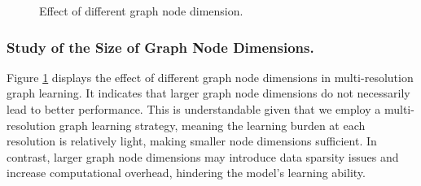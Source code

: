 \begin{figure}[!t]
    \vspace{-4mm}
    \centering
    \vspace{-4.5mm}
    \caption{Effect of different graph node dimension.}
    \label{fig:parameter_node_dim}
    \vspace{-5.5mm}
\end{figure}


\subsubsection{Study of the Size of Graph Node Dimensions.} Figure \ref{fig:parameter_node_dim} displays the effect of different graph node dimensions in multi-resolution graph learning. It indicates that larger graph node dimensions do not necessarily lead to better performance. This is understandable given that we employ a multi-resolution graph learning strategy, meaning the learning burden at each resolution is relatively light, making smaller node dimensions sufficient. In contrast, larger graph node dimensions may introduce data sparsity issues and increase computational overhead, hindering the model's learning ability. %



